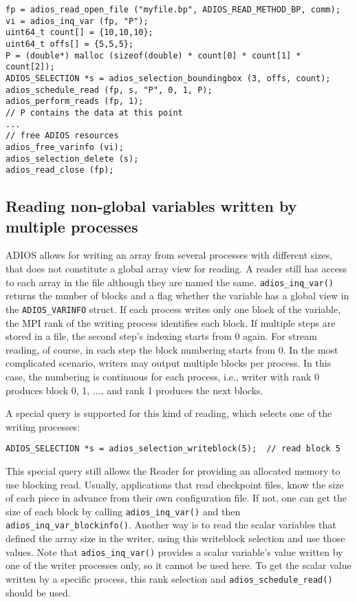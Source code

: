 \begin{lstlisting}[numbers=none,
                             caption={Read a bounding box of a variable},  label=code:boundingbox]
fp = adios_read_open_file ("myfile.bp", ADIOS_READ_METHOD_BP, comm);
vi = adios_inq_var (fp, "P");
uint64_t count[] = {10,10,10};
uint64_t offs[] = {5,5,5};
P = (double*) malloc (sizeof(double) * count[0] * count[1] * count[2]);
ADIOS_SELECTION *s = adios_selection_boundingbox (3, offs, count);
adios_schedule_read (fp, s, "P", 0, 1, P);
adios_perform_reads (fp, 1);   
// P contains the data at this point
...
// free ADIOS resources
adios_free_varinfo (vi); 
adios_selection_delete (s); 
adios_read_close (fp);
\end{lstlisting}


\subsection{Reading non-global variables written by multiple processes}
\label {section:non_global_vars}
ADIOS allows for writing an array from several processes with different sizes, that does not constitute a global array view for reading. A reader still has access to each array in the file although they are named the same. \verb+adios_inq_var()+ returns the number of blocks and a flag whether the variable has a global view in the \verb+ADIOS_VARINFO+ struct. If each process writes only one block of the variable, the MPI rank of the writing process identifies each block.  If multiple steps are stored in a file, the second step's indexing starts from 0 again. For stream reading, of course, in each step the block numbering starts from 0. In the most complicated scenario, writers may output multiple blocks per process. In this case, the numbering is continuous for each process, i.e., writer with rank 0 produces block 0, 1, ..., and rank 1 produces the next blocks. 

 A special query is supported for this kind of reading, which selects one of the writing processes:

\begin{lstlisting}[frame=none]
ADIOS_SELECTION *s = adios_selection_writeblock(5);  // read block 5 
\end{lstlisting}
 
This special query still allows the Reader for providing an allocated memory to use blocking read. Usually, applications that read checkpoint files, know the size of each piece in advance from their own configuration file. If not, one can get the size of each block by calling \verb+adios_inq_var()+ and then \verb+adios_inq_var_blockinfo()+. Another way is to read the scalar variables that defined the array size in the writer, using this writeblock selection and use those values. Note that \verb+adios_inq_var()+ provides a scalar variable's value written by one of the writer processes only, so it cannot be used here. To get the scalar value written by a specific process, this rank selection and \verb+adios_schedule_read()+ should be used.

